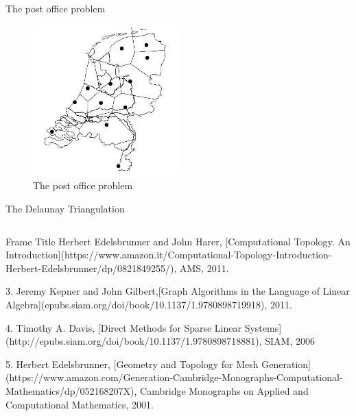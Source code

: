 \begin{frame}{The post office problem}
    \begin{figure}
        \centering
        \includegraphics[width=0.5\textwidth]{figs/L07-post-office-problem.jpg}
        
        \caption{The post office problem \cite{DeBerg2008}}
        \label{fig:my_label}
    \end{figure}
\end{frame}


\begin{frame}{The Delaunay Triangulation}
    \begin{columns}
    \end{columns}
\end{frame}

\begin{frame}{Frame Title}
   	Herbert Edelsbrunner and John Harer, [Computational Topology. An Introduction](https://www.amazon.it/Computational-Topology-Introduction-Herbert-Edelsbrunner/dp/0821849255/),  AMS, 2011.

3.	Jeremy Kepner and John Gilbert,[Graph Algorithms in the Language of Linear Algebra](epubs.siam.org/doi/book/10.1137/1.9780898719918), 2011.

4.	Timothy A. Davis, [Direct Methods for Sparse Linear Systems](http://epubs.siam.org/doi/book/10.1137/1.9780898718881), SIAM, 2006

5.	Herbert Edelsbrunner, [Geometry and Topology for Mesh Generation](https://www.amazon.com/Generation-Cambridge-Monographs-Computational-Mathematics/dp/052168207X), Cambridge Monographs on Applied and Computational Mathematics, 2001. \cite{Edelsbrunner2001}
\end{frame}



